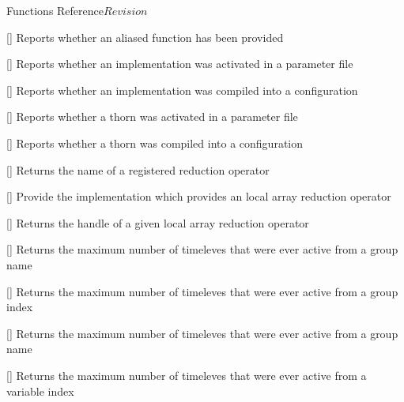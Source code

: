 \begin{cactuspart}{ Functions Reference}{}{$Revision$}
\begin{Lentry}
\item[\code{CCTK\_IsFunctionAliased}]
  [\pageref{CCTK-IsFunctionAliased}]
  Reports whether an aliased function has been provided

\item[\code{CCTK\_IsImplementationActive}]
  [\pageref{CCTK-IsImplementationActive}]
  Reports whether an implementation was activated in a parameter file

\item[\code{CCTK\_IsImplementationCompiled}]
  [\pageref{CCTK-IsImplementationCompiled}]
  Reports whether an implementation was compiled into a configuration

\item[\code{CCTK\_IsThornActive}] [\pageref{CCTK-IsThornActive}]
  Reports whether a thorn was activated in a parameter file

\item[\code{CCTK\_IsThornCompiled}] [\pageref{CCTK-IsThornCompiled}]
  Reports whether a thorn was compiled into a configuration

\item[\code{CCTK\_LocalArrayReduceOperator}] [\pageref{CCTK-LocalArrayReduceOperator}]
  Returns the name of a registered reduction operator

\item[\code{CCTK\_LocalArrayReduceOperatorImplementation}] [\pageref{CCTK-LocalArrayReduceOperatorImplementation}]
  Provide the implementation which provides an local array reduction operator

\item[\code{CCTK\_LocalArrayReductionHandle}] [\pageref{CCTK-LocalArrayReductionHandle}]
  Returns the handle of a given local array reduction operator

\item[\code{CCTK\_MaxActiveTimeLevels}] [\pageref{CCTK-MaxActiveTimeLevels}]
  Returns the maximum number of timeleves that were ever active from a group name

\item[\code{CCTK\_MaxActiveTimeLevelsGI}] [\pageref{CCTK-MaxActiveTimeLevels}]
  Returns the maximum number of timeleves that were ever active from a group index

\item[\code{CCTK\_MaxActiveTimeLevelsGN}] [\pageref{CCTK-MaxActiveTimeLevels}]
  Returns the maximum number of timeleves that were ever active from a group name

\item[\code{CCTK\_MaxActiveTimeLevelsVI}] [\pageref{CCTK-MaxActiveTimeLevels}]
  Returns the maximum number of timeleves that were ever active from a variable index


\end{Lentry}
\end{cactuspart}
